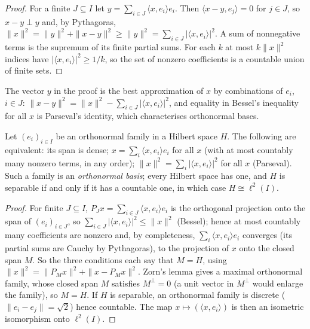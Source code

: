 \begin{proof}
For a finite $J \subseteq I$ let $y = \sum_{i \in J}\langle x, e_i \rangle e_i$. Then $\langle x - y, e_j\rangle = 0$ for $j \in J$, so $x - y \perp y$ and, by Pythagoras,
$\|x\|^2 = \|y\|^2 + \|x - y\|^2 \geq \|y\|^2 = \sum_{i \in J}|\langle x, e_i \rangle|^2$. A sum of nonnegative terms is the supremum of its finite partial sums. For each $k$ at most $k\|x\|^2$ indices
have $|\langle x, e_i\rangle|^2 \geq 1/k$, so the set of nonzero coefficients is a countable union of finite sets.
\end{proof}

The vector $y$ in the proof is the best approximation of $x$ by combinations of $e_i$, $i \in J$: $\|x - y\|^2 = \|x\|^2 - \sum_{i \in J}|\langle x, e_i\rangle|^2$, and equality in Bessel's inequality for all $x$ is
Parseval's identity, which characterises orthonormal bases.

\begin{theorem}\label{functional-analysis:theorem-orthonormal-basis}
Let $(e_i)_{i \in I}$ be an orthonormal family in a Hilbert space $H$. The following are equivalent: its span is dense; $x = \sum_i\langle x, e_i \rangle e_i$ for all $x$ (with at most countably many nonzero
terms, in any order); $\|x\|^2 = \sum_i|\langle x, e_i \rangle|^2$ for all $x$ (Parseval). Such a family is an \emph{orthonormal basis}; every Hilbert space has one, and $H$ is separable if and only if it has a
countable one, in which case $H \cong \ell^2(I)$.
\end{theorem}

\begin{proof}
For finite $J \subseteq I$, $P_Jx = \sum_{i \in J}\langle x, e_i \rangle e_i$ is the orthogonal projection onto the span of $(e_i)_{i \in J}$, so $\sum_{i \in J}|\langle x, e_i \rangle|^2 \leq \|x\|^2$ (Bessel);
hence at most countably many coefficients are nonzero and, by completeness, $\sum_i\langle x, e_i \rangle e_i$ converges (its partial sums are Cauchy by Pythagoras), to the projection of $x$ onto the closed
span $M$. So the three conditions each say that $M = H$, using $\|x\|^2 = \|P_Mx\|^2 + \|x - P_Mx\|^2$. Zorn's lemma gives a maximal orthonormal family, whose closed span $M$ satisfies $M^\perp = 0$ (a unit
vector in $M^\perp$ would enlarge the family), so $M = H$. If $H$ is separable, an orthonormal family is discrete ($\|e_i - e_j\| = \sqrt2$) hence countable. The map $x \mapsto (\langle x, e_i \rangle)$ is
then an isometric isomorphism onto $\ell^2(I)$.
\end{proof}

